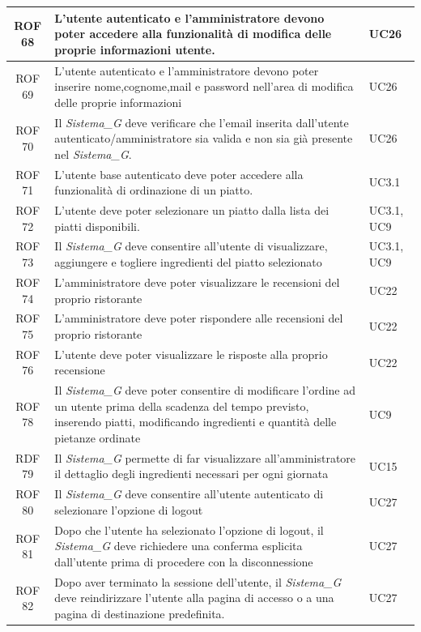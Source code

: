 \documentclass[12pt, oneside]{article}
\begin{document}
\begin{longtable}{|c|p{14cm}|p{2cm}|}
    \hline
    ROF 68 & L'utente autenticato e l'amministratore devono poter accedere alla funzionalità di modifica delle proprie informazioni utente.  & UC26  \\
    \hline
    ROF 69 & L'utente autenticato e l'amministratore devono poter inserire nome,cognome,mail e password nell'area di  modifica delle proprie informazioni  & UC26  \\
    \hline
    ROF 70 & Il \textit{Sistema_G} deve verificare che l'email inserita dall'utente autenticato/amministratore sia valida e non sia già presente nel \textit{Sistema_G}.  & UC26  \\
    \hline
    ROF 71 & L'utente base autenticato deve poter accedere alla funzionalità di ordinazione di un piatto.  & UC3.1  \\
    \hline
    ROF 72 & L'utente deve poter selezionare un piatto dalla lista dei piatti disponibili.  & UC3.1, UC9  \\
    \hline
    ROF 73 & Il \textit{Sistema_G} deve consentire all'utente di visualizzare, aggiungere e togliere ingredienti del piatto selezionato  & UC3.1, UC9  \\
    \hline
    ROF 74 & L'amministratore deve poter visualizzare le recensioni del proprio ristorante & UC22 \\ 
    \hline
    ROF 75 & L'amministratore deve poter rispondere alle recensioni del proprio ristorante & UC22 \\
    \hline
    ROF 76 & L'utente deve poter visualizzare le risposte alla proprio recensione & UC22 \\
    \hline
    ROF 78 & Il \textit{Sistema_G} deve poter consentire di modificare l'ordine ad un utente prima della scadenza del tempo previsto, inserendo piatti, modificando ingredienti e quantità delle pietanze ordinate & UC9 \\
    \hline
    RDF 79 & Il \textit{Sistema_G} permette di far visualizzare all'amministratore il dettaglio degli ingredienti necessari per ogni giornata & UC15 \\
    \hline
    ROF 80 & Il \textit{Sistema_G} deve consentire all'utente autenticato di selezionare l'opzione di logout & UC27 \\
    \hline
    ROF 81 & Dopo che l'utente ha selezionato l'opzione di logout, il \textit{Sistema_G} deve richiedere una conferma esplicita dall'utente prima di procedere con la disconnessione & UC27 \\ 
    \hline
    ROF 82 & Dopo aver terminato la sessione dell'utente, il \textit{Sistema_G} deve reindirizzare l'utente alla pagina di accesso o a una pagina di destinazione predefinita. & UC27 \\

\end{longtable}
\end{document}
